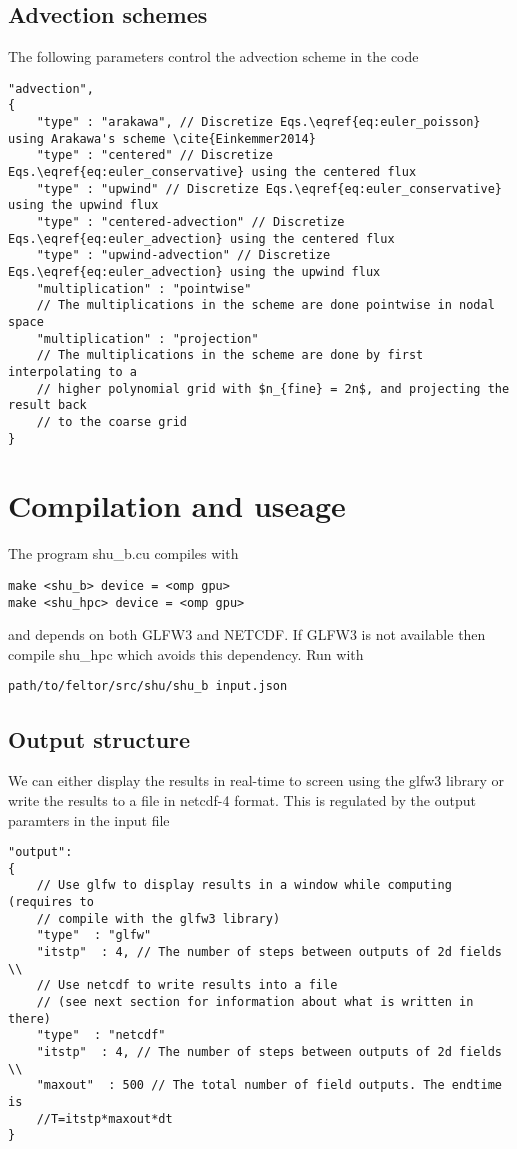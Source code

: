 \subsection{Advection schemes}
The following parameters control the advection scheme in the code
\begin{verbatim}
"advection",
{
    "type" : "arakawa", // Discretize Eqs.\eqref{eq:euler_poisson} using Arakawa's scheme \cite{Einkemmer2014}
    "type" : "centered" // Discretize Eqs.\eqref{eq:euler_conservative} using the centered flux
    "type" : "upwind" // Discretize Eqs.\eqref{eq:euler_conservative} using the upwind flux
    "type" : "centered-advection" // Discretize Eqs.\eqref{eq:euler_advection} using the centered flux
    "type" : "upwind-advection" // Discretize Eqs.\eqref{eq:euler_advection} using the upwind flux
    "multiplication" : "pointwise"
    // The multiplications in the scheme are done pointwise in nodal space
    "multiplication" : "projection"
    // The multiplications in the scheme are done by first interpolating to a
    // higher polynomial grid with $n_{fine} = 2n$, and projecting the result back
    // to the coarse grid
}
\end{verbatim}

\section{Compilation and useage}
The program shu\_b.cu compiles with
\begin{verbatim}
make <shu_b> device = <omp gpu>
make <shu_hpc> device = <omp gpu>
\end{verbatim}
and depends on both GLFW3 and NETCDF. If GLFW3 is not available then compile shu\_hpc which avoids this dependency.
Run with
\begin{verbatim}
path/to/feltor/src/shu/shu_b input.json
\end{verbatim}

\subsection{Output structure}

We can either display the results in real-time to screen using the glfw3 library or
write the results to a file in netcdf-4 format.
This is regulated by the output paramters in the input file
\begin{verbatim}
"output":
{
    // Use glfw to display results in a window while computing (requires to
    // compile with the glfw3 library)
    "type"  : "glfw"
    "itstp"  : 4, // The number of steps between outputs of 2d fields \\
    // Use netcdf to write results into a file
    // (see next section for information about what is written in there)
    "type"  : "netcdf"
    "itstp"  : 4, // The number of steps between outputs of 2d fields \\
    "maxout"  : 500 // The total number of field outputs. The endtime is
    //T=itstp*maxout*dt
}
\end{verbatim}
